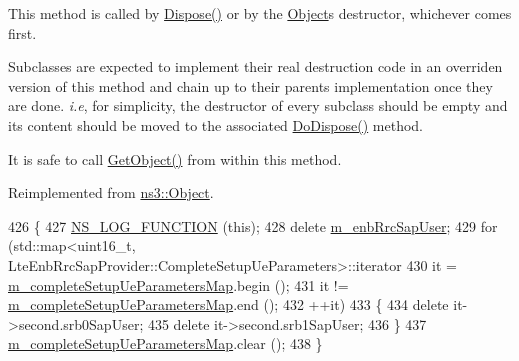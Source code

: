 This method is called by \hyperlink{classns3_1_1Object_aa90ae598863f6c251cdab3c3722afdaf}{Dispose()} or by the \hyperlink{classns3_1_1Object}{Object}\textquotesingle{}s destructor, whichever comes first.

Subclasses are expected to implement their real destruction code in an overriden version of this method and chain up to their parent\textquotesingle{}s implementation once they are done. {\itshape i.\+e}, for simplicity, the destructor of every subclass should be empty and its content should be moved to the associated \hyperlink{classns3_1_1LteEnbRrcProtocolReal_adfe67fe402cfe8216110a0d27e9e031f}{Do\+Dispose()} method.

It is safe to call \hyperlink{classns3_1_1Object_a13e18c00017096c8381eb651d5bd0783}{Get\+Object()} from within this method. 

Reimplemented from \hyperlink{classns3_1_1Object_a475d429a75d302d4775f4ae32479b287}{ns3\+::\+Object}.


\begin{DoxyCode}
426 \{
427   \hyperlink{log-macros-disabled_8h_a90b90d5bad1f39cb1b64923ea94c0761}{NS\_LOG\_FUNCTION} (\textcolor{keyword}{this});
428   \textcolor{keyword}{delete} \hyperlink{classns3_1_1LteEnbRrcProtocolReal_ac5bae445416141727fca34b8e35ad446}{m\_enbRrcSapUser};
429   \textcolor{keywordflow}{for} (std::map<uint16\_t, LteEnbRrcSapProvider::CompleteSetupUeParameters>::iterator 
430          it = \hyperlink{classns3_1_1LteEnbRrcProtocolReal_a17dc0a3ea91240fabb13106efba73176}{m\_completeSetupUeParametersMap}.begin ();
431        it != \hyperlink{classns3_1_1LteEnbRrcProtocolReal_a17dc0a3ea91240fabb13106efba73176}{m\_completeSetupUeParametersMap}.end ();
432        ++it)
433     \{     
434       \textcolor{keyword}{delete} it->second.srb0SapUser;
435       \textcolor{keyword}{delete} it->second.srb1SapUser;
436     \}
437   \hyperlink{classns3_1_1LteEnbRrcProtocolReal_a17dc0a3ea91240fabb13106efba73176}{m\_completeSetupUeParametersMap}.clear ();
438 \}
\end{DoxyCode}
